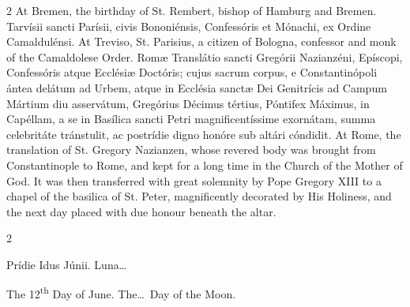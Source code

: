 \begin{paracol}{2}
\switchcolumn
{}
At Bremen, the birthday of St. 
 Rembert, bishop of Hamburg and Bremen.
\switchcolumn*
{}
Tarvísii sancti Parísii, 
 civis Bononiénsis, Confessóris et Mónachi, ex Ordine Camaldulénsi.
\switchcolumn
{}
At Treviso, St. Parisius, a citizen 
 of Bologna, confessor and monk of the Camaldolese Order.
\switchcolumn*
{}
Romæ Translátio sancti 
 Gregórii Nazianzéni, Epíscopi, Confessóris atque Ecclésiæ Doctóris; cujus 
 sacrum corpus, e Constantinópoli ántea delátum ad Urbem, atque in Ecclésia 
 sanctæ Dei Genitrícis ad Campum Mártium diu asservátum, Gregórius Décimus 
 tértius, Póntifex Máximus, in Capéllam, a se in Basílica sancti Petri 
 magnificentíssime exornátam, summa celebritáte tránstulit, ac postrídie 
 digno honóre sub altári cóndidit.
\switchcolumn
{}
At Rome, the translation of St. 
 Gregory Nazianzen, whose revered body was brought from Constantinople to 
 Rome, and kept for a long time in the Church of the Mother of God. It 
 was then transferred with great solemnity by Pope Gregory XIII to a chapel 
 of the basilica of St. Peter, magnificently decorated by His Holiness, and 
 the next day placed with due honour beneath the altar.
\switchcolumn*
{}
\end{paracol}


\begin{paracol}{2}
\begin{center}{\color{gregoriocolor} Prídie Idus Júnii. 
 Luna\dots\ }\end{center}
\switchcolumn
{}
\begin{center}{\color{gregoriocolor} The 12\textsuperscript{th} Day of 
 June. The\dots\ Day of the Moon.}\end{center}
\end{paracol}

